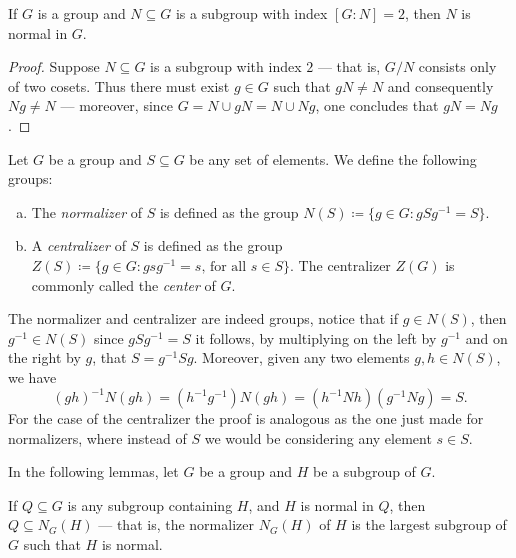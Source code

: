 \begin{proposition}
\label{prop:index-2-is-normal}
If \(G\) is a group and \(N \subseteq G\) is a subgroup with index
\([G \colon N] = 2\), then \(N\) is normal in \(G\).
\end{proposition}

\begin{proof}
Suppose \(N \subseteq G\) is a subgroup with index \(2\) --- that is, \(G/N\)
consists only of two cosets. Thus there must exist \(g \in G\) such that
\(g N \neq N\) and consequently \(N g \neq N\) --- moreover, since
\(G = N \cup g N = N \cup N g\), one concludes that \(g N = N g\).
\end{proof}

\begin{definition}
\label{def:normalizer-centralizer}
Let \(G\) be a group and \(S \subseteq G\) be any set of elements. We define the
following groups:
\begin{enumerate}[(a)]\setlength\itemsep{0em}
\item The \emph{normalizer} of \(S\) is defined as the group
  \(N(S) \coloneq \{g \in G \colon g S g^{-1} = S\}\).
\item A \emph{centralizer} of \(S\) is defined as the group
  \(Z(S) \coloneq \{g \in G \colon g s g^{-1} = s \text{, for all } s \in
  S\}\). The centralizer \(Z(G)\) is commonly called the \emph{center} of \(G\).
\end{enumerate}
\end{definition}

The normalizer and centralizer are indeed groups, notice that if \(g \in N(S)\),
then \(g^{-1} \in N(S)\) since \(g S g^{-1} = S\) it follows, by multiplying on
the left by \(g^{-1}\) and on the right by \(g\), that
\(S = g^{-1} S g\). Moreover, given any two elements \(g, h \in N(S)\), we have
\[
  (g h)^{-1} N (g h) = (h^{-1} g ^{-1}) N (g h) = (h^{-1}N h) (g^{-1} N g) = S.
\]
For the case of the centralizer the proof is analogous as the one just made for
normalizers, where instead of \(S\) we would be considering any element
\(s \in S\).

In the following lemmas, let \(G\) be a group and \(H\) be a subgroup of \(G\).

\begin{lemma}
If \(Q \subseteq G\) is any subgroup containing \(H\), and \(H\) is normal in
\(Q\), then \(Q \subseteq N_G(H)\) --- that is, the normalizer \(N_G(H)\) of
\(H\) is the largest subgroup of \(G\) such that \(H\) is normal.
\end{lemma}

